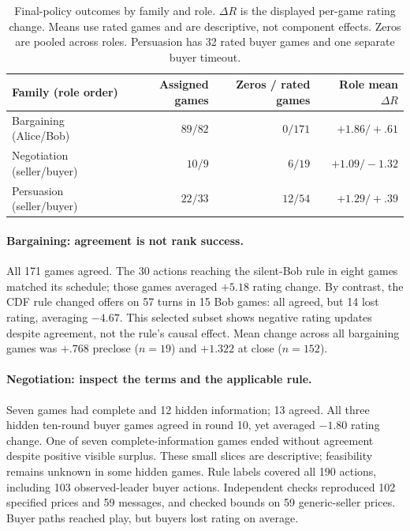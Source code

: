 \documentclass{article}
\begin{document}
\begin{table}[H]
\centering
\small
\caption{Final-policy outcomes by family and role. $\Delta R$ is the displayed
per-game rating change. Means use rated games and are descriptive, not
component effects. Zeros are pooled across roles. Persuasion has 32 rated buyer
games and one separate buyer timeout.}
\label{tab:behavior}
\begin{tabularx}{\linewidth}{@{}Yrrr@{}}
\toprule
Family (role order) & Assigned games & Zeros / rated games & Role mean $\Delta R$ \\
\midrule
Bargaining (Alice/Bob) & $89/82$ & $0/171$ & $+1.86/+.61$ \\
Negotiation (seller/buyer) & $10/9$ & $6/19$ & $+1.09/-1.32$ \\
Persuasion (seller/buyer) & $22/33$ & $12/54$ & $+1.29/+.39$ \\
\bottomrule
\end{tabularx}
\end{table}

\paragraph{Bargaining: agreement is not rank success.}
All 171 games agreed. The 30 actions reaching the silent-Bob rule in eight
games matched its schedule; those games averaged $+5.18$ rating change.
By contrast, the CDF rule changed offers on 57 turns in 15 Bob games: all
agreed, but 14 lost rating, averaging $-4.67$. This selected subset shows
negative rating updates despite agreement, not the rule's causal effect.
Mean change across all bargaining games was $+.768$ preclose ($n=19$) and
$+1.322$ at close ($n=152$).

\paragraph{Negotiation: inspect the terms and the applicable rule.}
Seven games had complete and 12 hidden information; 13 agreed.
All three hidden ten-round buyer games agreed in round 10,
yet averaged $-1.80$ rating change. One of seven complete-information games
ended without agreement despite positive visible surplus. These small slices
are descriptive; feasibility remains unknown in some hidden games.
Rule labels covered all 190 actions, including 103 observed-leader buyer
actions. Independent checks reproduced 102 specified prices and 59 messages,
and checked bounds on 59 generic-seller prices. Buyer paths reached play,
but buyers lost rating on average.
\end{document}
